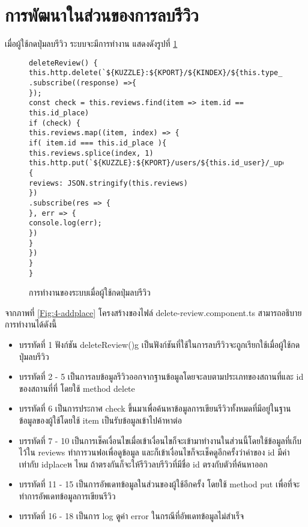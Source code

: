 \section{การพัฒนาในส่วนของการลบรีวิว}
เมื่อผู้ใช้กดปุ่มลบรีวิว ระบบจะมีการทำงาน แสดงดังรูปที่ \ref{Fig:4-deletere}
\begin{figure}[H]
{\begin{lstlisting}
deleteReview() {
this.http.delete(`${KUZZLE}:${KPORT}/${KINDEX}/${this.type_review}/${this.id_place}`)
.subscribe((response) =>{
});
const check = this.reviews.find(item => item.id == this.id_place)
if (check) {
this.reviews.map((item, index) => {
if( item.id === this.id_place ){
this.reviews.splice(index, 1)
this.http.put(`${KUZZLE}:${KPORT}/users/${this.id_user}/_update`, {
reviews: JSON.stringify(this.reviews)
})
.subscribe(res => {
}, err => {
console.log(err);
})
}
})
}
}
\end{lstlisting}}
\caption{การทำงานของระบบเมื่อผู้ใช้กดปุ่มลบรีวิว}
\label{Fig:4-deletere}
\end{figure}
\newpage
จากภาพที่ \ref{Fig:4-addplace} โครงสร้างของไฟล์ delete-review.component.ts สามารถอธิบายการทำงานได้ดังนี้
\begin{itemize}[label={--}]
\item บรรทัดที่ 1 ฟังก์ชัน deleteReview()g เป็นฟังก์ชันที่ใช้ในการลบรีวิวจะถูกเรียกใช้เมื่อผู้ใช้กดปุ่มลบรีวิว
\item บรรทัดที่ 2 - 5 เป็นการลบข้อมูลรีวิวออกจากฐานข้อมูลโดยจะลบตามประเภทของสถานที่และ id ของสถานที่ที่ โดยใช้ method delete
\item บรรทัดที่ 6 เป็นการประกาศ check ขึ้นมาเพื่อค้นหาข้อมูลการเขียนรีวิวทั้งหมดที่มีอยู่ในฐานข้อมูลของผู้ใช้โดยใช้ item เป็นรับข้อมูลเข้าไปค้าหาต่อ
\item บรรทัดที่ 7 - 10  เป็นการเช็คเงื่อนไขเมื่อเข้าเงื่อนไขก็จะเข้ามาทำงานในส่วนนี้โดยใช้ข้อมูลที่เก็บไว้ใน reviews ทำการวนฟอเพื่อดูข้อมูล และก็เข้าเงื่อนไขก็จะเช็คดูอีกครั้งว่าค่าของ id มีค่าเท่ากับ idplaceห ไหม ถ้าตรงกันก็จะให้รีวิวลบรีวิวที่มีชื่อ id ตรงกับตัวที่ค้นหาออก
\item บรรทัดที่ 11 - 15 เป็นการอัพเดทข้อมูลในส่วนของผู้ใช้อีกครั้ง โดยใช้ method put เพื่อที่จะทำการอัพเดทข้อมูลการเขียนรีวิว
\item บรรทัดที่ 16 - 18 เป็นการ log ดูค่า error ในกรณีที่อัพเดทข้อมูลไม่สำเร็จ
\end{itemize}
\newpage
